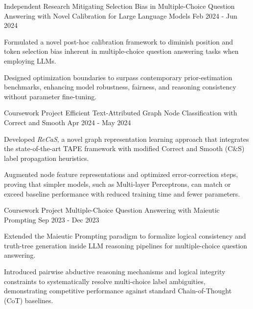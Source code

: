 
\begin{cventries}

  \cventry
    {Independent Research} %
    {Mitigating Selection Bias in Multiple-Choice Question Answering with Novel Calibration for Large Language Models} %
    {} %
    {Feb 2024 - Jun 2024} %
    {
      \begin{cvitems} %
        \item {Formulated a novel post-hoc calibration framework to diminish position and token selection bias inherent in multiple-choice question answering tasks when employing LLMs.}
        \item {Designed optimization boundaries to surpass contemporary prior-estimation benchmarks, enhancing model robustness, fairness, and reasoning consistency without parameter fine-tuning.}
      \end{cvitems}
    }

  \cventry
    {Coursework Project} %
    {Efficient Text-Attributed Graph Node Classification with Correct and Smooth} %
    {} %
    {Apr 2024 - May 2024} %
    {
      \begin{cvitems} %
        \item {Developed \textit{ReCaS}, a novel graph representation learning approach that integrates the state-of-the-art TAPE framework with modified Correct and Smooth (C\&S) label propagation heuristics.}
        \item {Augmented node feature representations and optimized error-correction steps, proving that simpler models, such as Multi-layer Perceptrons, can match or exceed baseline performance with reduced training time and fewer parameters.}
      \end{cvitems}
    }

  \cventry
    {Coursework Project} %
    {Multiple-Choice Question Answering with Maieutic Prompting} %
    {} %
    {Sep 2023 - Dec 2023} %
    {
      \begin{cvitems} %
        \item {Extended the Maieutic Prompting paradigm to formalize logical consistency and truth-tree generation inside LLM reasoning pipelines for multiple-choice question answering.}
        \item {Introduced pairwise abductive reasoning mechanisms and logical integrity constraints to systematically resolve multi-choice label ambiguities, demonstrating competitive performance against standard Chain-of-Thought (CoT) baselines.}
      \end{cvitems}
    }


\end{cventries}
